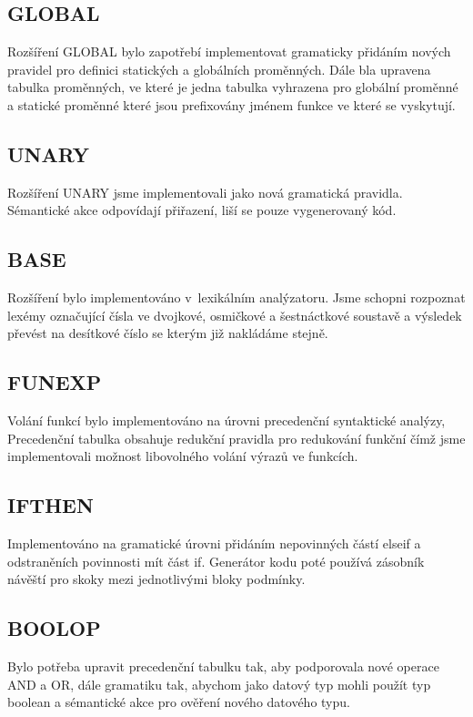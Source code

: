 \subsection{GLOBAL}
Rozšíření GLOBAL bylo zapotřebí implementovat gramaticky přidáním
nových pravidel pro definici statických a globálních proměnných.
Dále bla upravena tabulka proměnných, ve které je jedna tabulka vyhrazena
pro globální proměnné a statické proměnné které jsou prefixovány
jménem funkce ve které se vyskytují.

\subsection{UNARY}
Rozšíření UNARY jsme implementovali jako nová gramatická pravidla. Sémantické
akce odpovídají přiřazení, liší se pouze vygenerovaný kód.

\subsection{BASE}
Rozšíření bylo implementováno v~lexikálním analýzatoru. Jsme schopni rozpoznat
lexémy označující čísla ve dvojkové, osmičkové a šestnáctkové soustavě a
výsledek převést na desítkové číslo se kterým již nakládáme stejně.

\subsection{FUNEXP}
Volání funkcí bylo implementováno na úrovni precedenční syntaktické analýzy,
Precedenční tabulka obsahuje redukční pravidla pro redukování funkční čímž jsme implementovali
možnost libovolného volání výrazů ve funkcích.

\subsection{IFTHEN}
Implementováno na gramatické úrovni přidáním nepovinných částí
elseif a odstraněních povinnosti mít část if.
Generátor kodu poté používá zásobník návěští pro skoky mezi jednotlivými bloky podmínky.

\subsection{BOOLOP}
Bylo potřeba upravit precedenční tabulku tak, aby podporovala nové
operace AND a OR, dále gramatiku tak, abychom jako datový typ mohli
použít typ boolean a sémantické akce pro ověření nového datového typu.